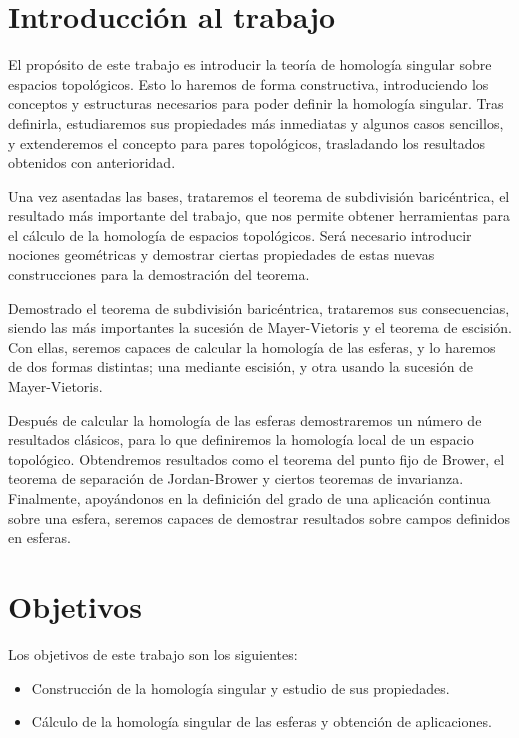 \label{ch:introduccionHOM}

\section{Introducción al trabajo}

El propósito de este trabajo es introducir la teoría de homología singular sobre
espacios topológicos. Esto lo haremos de forma constructiva, introduciendo los conceptos
y estructuras necesarios para poder definir la homología singular.
Tras definirla, estudiaremos sus propiedades más inmediatas y algunos casos sencillos,
y extenderemos el concepto para pares topológicos, trasladando los resultados obtenidos
con anterioridad.

Una vez asentadas las bases, trataremos el teorema de subdivisión baricéntrica, el
resultado más importante del trabajo, que nos permite obtener herramientas para el
cálculo de la homología de espacios topológicos. Será necesario introducir nociones
geométricas y demostrar ciertas propiedades de estas nuevas construcciones para la
demostración del teorema.

Demostrado el teorema de subdivisión baricéntrica, trataremos sus consecuencias,
siendo las más importantes la sucesión de Mayer-Vietoris y el teorema de escisión.
Con ellas, seremos capaces de calcular la homología de las esferas, y lo haremos
de dos formas distintas; una mediante escisión, y otra usando la sucesión de Mayer-Vietoris.

Después de calcular la homología de las esferas demostraremos un número de resultados clásicos,
para lo que definiremos la homología local de un espacio topológico. Obtendremos resultados
como el teorema del punto fijo de Brower, el teorema de separación de Jordan-Brower y
ciertos teoremas de invarianza. Finalmente, apoyándonos en la definición del grado de
una aplicación continua sobre una esfera, seremos capaces de demostrar resultados
sobre campos definidos en esferas.

\section{Objetivos}
Los objetivos de este trabajo son los siguientes:

\begin{itemize}
  \item Construcción de la homología singular y estudio de sus propiedades.

  \item Cálculo de la homología singular de las esferas y obtención de aplicaciones.

\end{itemize}


